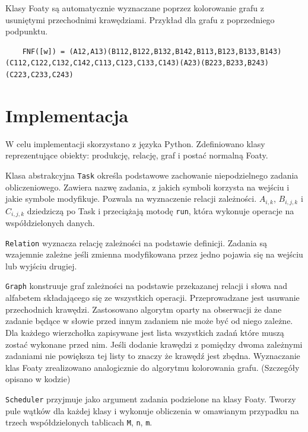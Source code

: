 \documentclass[12pt, letterpaper]{article}
\begin{document}
Klasy Foaty są automatycznie wyznaczane poprzez kolorowanie grafu z usuniętymi przechodnimi krawędziami. Przykład dla grafu z poprzedniego podpunktu.

\begin{lstlisting}
	FNF([w]) = (A12,A13)(B112,B122,B132,B142,B113,B123,B133,B143)(C112,C122,C132,C142,C113,C123,C133,C143)(A23)(B223,B233,B243)(C223,C233,C243)
\end{lstlisting}

\section{Implementacja}
W celu implementacji skorzystano z języka Python.
Zdefiniowano klasy reprezentujące obiekty: produkcję, relację, graf i postać normalną Foaty.

Klasa abstrakcyjna \texttt{Task} określa podstawowe zachowanie niepodzielnego zadania obliczeniowego.
Zawiera nazwę zadania, z jakich symboli korzysta na wejściu i jakie symbole modyfikuje. Pozwala na wyznaczenie relacji zależności.
$ A_{i,k} $, $B_{i,j,k}$ i $ C_{i,j,k} $ dziedziczą po Task i przeciążają motodę \texttt{run}, która wykonuje operacje na współdzielonych danych.

\texttt{Relation} wyznacza relację zależności na podstawie definicji. Zadania są wzajemnie zależne jeśli zmienna modyfikowana przez jedno pojawia się na wejściu lub wyjściu drugiej.

\texttt{Graph} konstruuje graf zależności na podstawie przekazanej relacji i słowa nad alfabetem składającego się ze wszystkich operacji.
Przeprowadzane jest usuwanie przechodnich krawędzi.
Zastosowano algorytm oparty na obserwacji że dane zadanie będące w słowie przed innym zadaniem nie może być od niego zależne.
Dla każdego wierzchołka zapisywane jest lista wszystkich zadań które muszą zostać wykonane przed nim.
Jeśli dodanie krawędzi z pomiędzy dwoma zależnymi zadaniami nie powiększa tej listy to znaczy że krawędź jest zbędna.
Wyznaczanie klas Foaty zrealizowano analogicznie do algorytmu kolorowania grafu.
(Szczegóły opisano w kodzie)


\texttt{Scheduler} przyjmuje jako argument zadania podzielone na klasy Foaty.
Tworzy pule wątków dla każdej klasy i wykonuje obliczenia w omawianym przypadku na trzech współdzielonych tablicach \texttt{M}, \texttt{n}, \texttt{m}.
\end{document}
